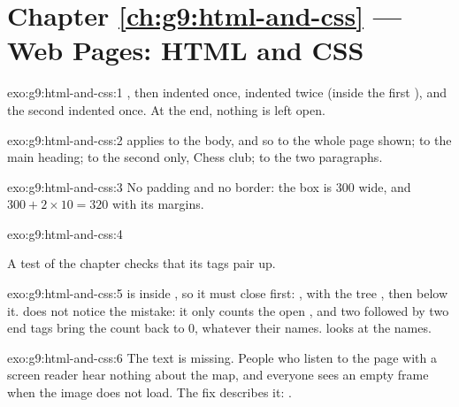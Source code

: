 \section*{Chapter \ref{ch:g9:html-and-css} --- Web Pages: HTML and CSS}

\begin{solution}{exo:g9:html-and-css:1}
, then  indented once,  indented twice (inside the
first ), and the second  indented once. At the end, nothing is
left open.
\end{solution}

\begin{solution}{exo:g9:html-and-css:2}
 applies to the body, and so to the whole page shown;  to
the main heading;  to the second  only, Chess club;
 to the two paragraphs.
\end{solution}

\begin{solution}{exo:g9:html-and-css:3}
No padding and no border: the box is 300  wide, and
$300 + 2 \times 10 = 320$ with its margins.
\end{solution}

\begin{solution}{exo:g9:html-and-css:4}
\label{lst:g9:html-and-css:sol-page}

A test of the chapter checks that its tags pair up.
\end{solution}

\begin{solution}{exo:g9:html-and-css:5}
 is inside , so it must close first:
, with the tree , then
 below it.  does not notice the mistake: it only
counts the open , and two  followed by two end tags bring
the count back to 0, whatever their names. 
looks at the names.
\end{solution}

\begin{solution}{exo:g9:html-and-css:6}
The  text is missing. People who listen to the page with a screen
reader hear nothing about the map, and everyone sees an empty frame when the
image does not load. The fix describes it:
.
\end{solution}

